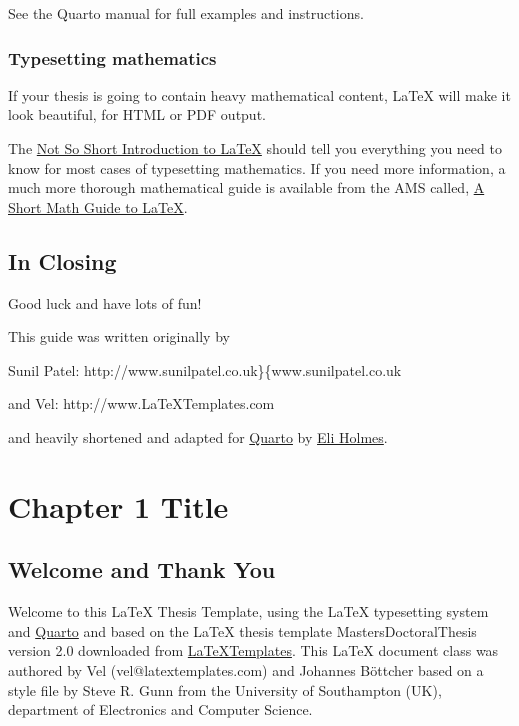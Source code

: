 \documentclass[
  letterpaper,
  11pt,
  english,
  singlespacing,
  headsepline]{MastersDoctoralThesis}
\begin{document}
See the Quarto manual for full examples and instructions.

\subsection{Typesetting mathematics}\label{typesetting-mathematics}

If your thesis is going to contain heavy mathematical content, \LaTeX{}
will make it look beautiful, for HTML or PDF output.

The
\href{http://www.ctan.org/tex-archive/info/lshort/english/lshort.pdf}{Not
So Short Introduction to LaTeX} should tell you everything you need to
know for most cases of typesetting mathematics. If you need more
information, a much more thorough mathematical guide is available from
the AMS called,
\href{http://tug.ctan.org/info/short-math-guide/short-math-guide.pdf}{A
Short Math Guide to LaTeX}.

\section{In Closing}\label{in-closing}

Good luck and have lots of fun!

This guide was written originally by

Sunil Patel: http://www.sunilpatel.co.uk\}\{www.sunilpatel.co.uk

and Vel: http://www.LaTeXTemplates.com

and heavily shortened and adapted for \href{https://quarto.org/}{Quarto}
by \href{https://eeholmes.github.io}{Eli Holmes}.


\chapter{Chapter 1 Title}\label{sec-Chapter1}

\section{Welcome and Thank You}\label{welcome-and-thank-you-1}

Welcome to this \LaTeX{} Thesis Template, using the \LaTeX{} typesetting
system and \href{quarto.org}{Quarto} and based on the \LaTeX{} thesis
template MastersDoctoralThesis version 2.0 downloaded from
\href{http://www.LaTeXTemplates.com}{LaTeXTemplates}. This LaTeX
document class was authored by Vel (vel@latextemplates.com) and Johannes
Böttcher based on a style file by Steve R. Gunn from the University of
Southampton (UK), department of Electronics and Computer Science.
\end{document}
